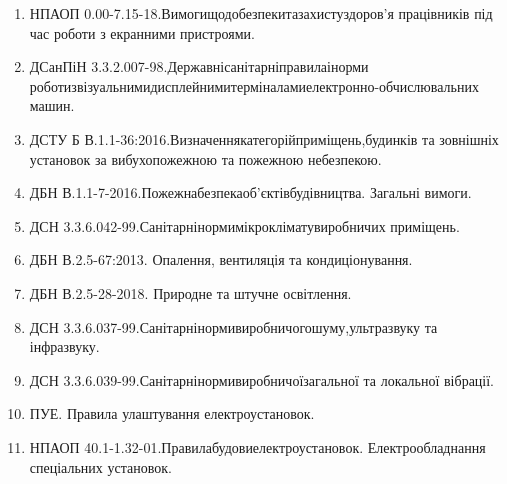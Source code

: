 \begin{enumerate}
	\item НПАОП 0.00-7.15-18.\hfill Вимоги\hfill щодо\hfill безпеки\hfill та\hfill захисту\hfill здоров’я\newline \hspace*{-20mm} працівників під час роботи з екранними пристроями.
	\item ДСанПіН 3.3.2.007-98.\hfill Державні\hfill санітарні\hfill правила\hfill і\hfill норми\newline \hspace*{-20mm} роботи\hfill з\hfill візуальними\hfill дисплейними\hfill терміналами\hfill електронно-\newline \hspace*{-18mm}обчислювальних машин. 
	\item ДСТУ Б В.1.1-36:2016.\hfill Визначення\hfill категорій\hfill приміщень,\hfill будинків\newline \hspace*{-18mm} та зовнішніх установок за вибухопожежною та пожежною небезпекою. 
	\item ДБН В.1.1-7-2016.\hfill Пожежна\hfill безпека\hfill об’єктів\hfill будівництва.\newline \hspace*{-18mm} Загальні вимоги. 
	\item ДСН 3.3.6.042-99.\hfill Санітарні\hfill норми\hfill мікроклімату\hfill виробничих\newline \hspace*{-18mm} приміщень.
	\item ДБН В.2.5-67:2013. Опалення, вентиляція та кондиціонування.
	\item ДБН В.2.5-28-2018. Природне та штучне освітлення.
	\item ДСН 3.3.6.037-99.\hfill Санітарні\hfill норми\hfill виробничого\hfill шуму,\hfill ультразвуку\newline \hspace*{-18mm} та інфразвуку.
	\item ДСН 3.3.6.039-99.\hfill Санітарні\hfill норми\hfill виробничої\hfill загальної\newline \hspace*{-18mm} та локальної вібрації.
	\item ПУЕ. Правила улаштування електроустановок. 
	\item НПАОП 40.1-1.32-01.\hfill Правила\hfill будови\hfill електроустановок.\newline \hspace*{-18mm} Електрообладнання спеціальних установок.

\end{enumerate}
